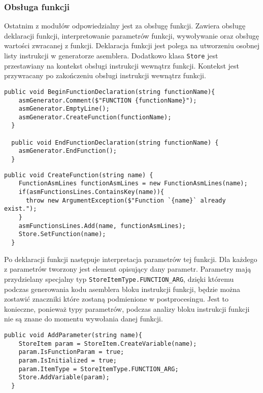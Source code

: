 \subsubsection{Obsługa funkcji}

\par Ostatnim z modułów odpowiedzialny jest za obsługę funkcji. Zawiera obsługę deklaracji funkcji, interpretowanie parametrów funkcji, wywoływanie oraz obsługę wartości zwracanej z funkcji. Deklaracja funkcji jest polega na utworzeniu osobnej listy instrukcji w generatorze asemblera. Dodatkowo klasa \texttt{Store} jest przestawiany na kontekst obsługi instrukcji wewnątrz funkcji. Kontekst jest przywracany po zakończeniu obsługi instrukcji wewnątrz funkcji.

\begin{lstlisting}[language=CSharp, caption={Implementacja funkcji do deklaracji funkcji}, label=alg:f1]
  public void BeginFunctionDeclaration(string functionName){
    asmGenerator.Comment($"FUNCTION {functionName}");
    asmGenerator.EmptyLine();
    asmGenerator.CreateFunction(functionName);
  }
  
  public void EndFunctionDeclaration(string functionName) {
    asmGenerator.EndFunction();
  }
\end{lstlisting}

\begin{lstlisting}[language=CSharp, caption={Implementacja funkcji w klasie \texttt{Store} do deklaracji funkcji}, label=alg:f1]
  public void CreateFunction(string name) {
    FunctionAsmLines functionAsmLines = new FunctionAsmLines(name);
    if(asmFunctionsLines.ContainsKey(name)){
      throw new ArgumentException($"Function `{name}` already exist.");
    }
    asmFunctionsLines.Add(name, functionAsmLines);
    Store.SetFunction(name);
  }
\end{lstlisting}

\par Po deklaracji funkcji następuje interpretacja parametrów tej funkcji. Dla każdego z parametrów tworzony jest element opisujący dany parametr. Parametry mają przydzielany specjalny typ \texttt{StoreItemType.FUNCTION\_ARG}, dzięki któremu podczas generowania kodu asemblera bloku instrukcji funkcji, będzie można zostawić znaczniki które zostaną podmienione w postprocesingu. Jest to konieczne, ponieważ typy parametrów, podczas analizy bloku instrukcji funkcji nie są znane do momentu wywołania danej funkcji.

\begin{lstlisting}[language=CSharp, caption={Implementacja funkcji obsługującej parametry deklarowanej funkcji}, label=alg:f1]
  public void AddParameter(string name){
    StoreItem param = StoreItem.CreateVariable(name);
    param.IsFunctionParam = true;
    param.IsInitialized = true;
    param.ItemType = StoreItemType.FUNCTION_ARG;
    Store.AddVariable(param);
  }
\end{lstlisting}

